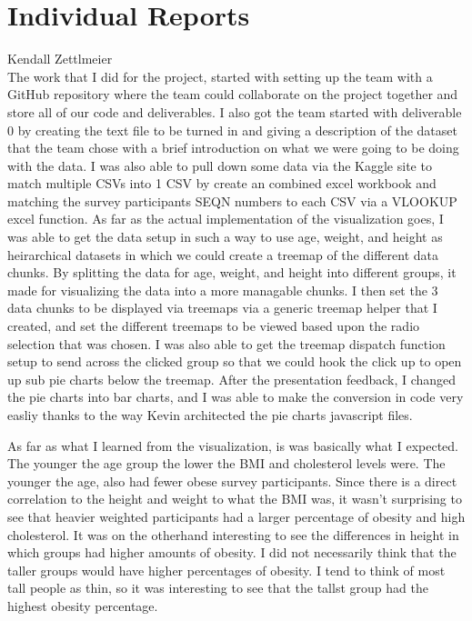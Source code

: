 \documentclass[12pt]{article}
\numberwithin{figure}{section}
\begin{document}
{\section{Individual Reports}}
{\sf Kendall Zettlmeier}\\
The work that I did for the project, started with setting up the team with a GitHub repository where the team could collaborate on the project together and store all of our code and deliverables.  I also got the team started with deliverable 0 by creating the text file to be turned in and giving a description of the dataset that the team chose with a brief introduction on what we were going to be doing with the data.  I was also able to pull down some data via the Kaggle site to match multiple CSVs into 1 CSV by create an combined excel workbook and matching the survey participants SEQN numbers to each CSV via a VLOOKUP excel function.  As far as the actual implementation of the visualization goes, I was able to get the data setup in such a way to use age, weight, and height as heirarchical datasets in which we could create a treemap of the different data chunks.  By splitting the data for age, weight, and height into different groups, it made for visualizing the data into a more managable chunks.  I then set the 3 data chunks to be displayed via treemaps via a generic treemap helper that I created, and set the different treemaps to be viewed based upon the radio selection that was chosen.  I was also able to get the treemap dispatch function setup to send across the clicked group so that we could hook the click up to open up sub pie charts below the treemap.  After the presentation feedback, I changed the pie charts into bar charts, and I was able to make the conversion in code very easliy thanks to the way Kevin architected the pie charts javascript files.

As far as what I learned from the visualization, is was basically what I expected.  The younger the age group the lower the BMI and cholesterol levels were.  The younger the age, also had fewer obese survey participants.  Since there is a direct correlation to the height and weight to what the BMI was, it wasn't surprising to see that heavier weighted participants had a larger percentage of obesity and high cholesterol.  It was on the otherhand interesting to see the differences in height in which groups had higher amounts of obesity.  I did not necessarily think that the taller groups would have higher percentages of obesity.  I tend to think of most tall people as thin, so it was interesting to see that the tallst group had the highest obesity percentage.
\end{document}
